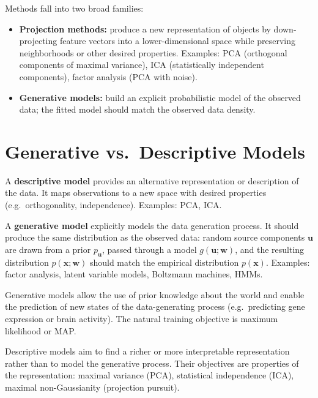 \documentclass[11pt, oneside]{book}
\newcommand{\wvec}{\bm{w}}
\newcommand{\xvec}{\bm{x}}
\newcommand{\uvec}{\bm{u}}
\begin{document}
Methods fall into two broad families:
\begin{itemize}
  \item \textbf{Projection methods:} produce a new representation of objects by
        down-projecting feature vectors into a lower-dimensional space while preserving
        neighborhoods or other desired properties.
        Examples: PCA (orthogonal components of maximal variance), ICA (statistically
        independent components), factor analysis (PCA with noise).
  \item \textbf{Generative models:} build an explicit probabilistic model of the observed
        data; the fitted model should match the observed data density.
\end{itemize}


\section{Generative vs.\ Descriptive Models}
\label{sec:gen-vs-desc}

\begin{defbox}[title={Descriptive (Recoding) Model}]
A \textbf{descriptive model} provides an alternative representation or description of the
data. It maps observations to a new space with desired properties (e.g.\ orthogonality,
independence). Examples: PCA, ICA.
\end{defbox}

\begin{defbox}[title={Generative Model}]
A \textbf{generative model} explicitly models the data generation process.
It should produce the same distribution as the observed data: random source components
$\uvec$ are drawn from a prior $p_{\uvec}$, passed through a model
$g(\uvec;\wvec)$, and the resulting distribution $p(\xvec;\wvec)$ should match the
empirical distribution $p(\xvec)$.
Examples: factor analysis, latent variable models, Boltzmann machines, HMMs.
\end{defbox}

Generative models allow the use of prior knowledge about the world and enable the
prediction of new states of the data-generating process (e.g.\ predicting gene expression
or brain activity). The natural training objective is maximum likelihood or MAP.

Descriptive models aim to find a richer or more interpretable representation rather than
to model the generative process.
Their objectives are properties of the representation: maximal variance (PCA),
statistical independence (ICA), maximal non-Gaussianity (projection pursuit).
\end{document}
